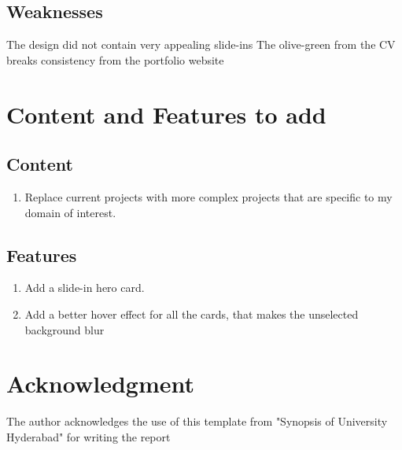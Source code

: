 \documentclass[12pt,a4paper,oneside]{report}
\begin{document}
\subsection{Weaknesses}
The design did not contain very appealing slide-ins
The olive-green from the CV breaks consistency from the portfolio website


\section{Content and Features to add}
\subsection{Content}
\begin{enumerate}
 \item Replace current projects with more complex projects that are specific to my domain of interest.
 \end{enumerate}
 
\subsection{Features}
 \begin{enumerate}
     \item Add a slide-in hero card.
      \item Add a better hover effect for all the cards, that makes the unselected background blur
 \end{enumerate}
\section{Acknowledgment}
The author acknowledges the use of this template from "Synopsis of University Hyderabad" for writing the report
\end{document}
